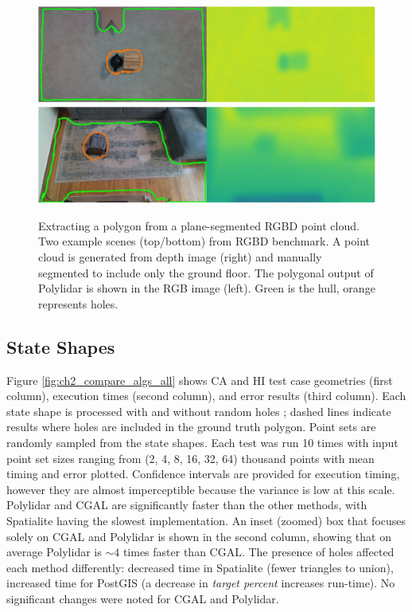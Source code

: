 \begin{figure}[ht] 
    \centering
      \includegraphics[width=0.80\linewidth]{chapter_2_polylidar/imgs/RealSensePictures-scene_08_stack.pdf}
      \includegraphics[width=0.80\linewidth]{chapter_2_polylidar/imgs/RealSensePictures-scene_11_stack.pdf}
  \caption[Extracting a polygon from a plane-segmented RGBD point cloud]{Extracting a polygon from a plane-segmented RGBD point cloud. Two example scenes (top/bottom) from RGBD benchmark. A point cloud is generated from depth image (right) and manually segmented to include only the ground floor. The polygonal output of Polylidar is shown in the RGB image (left). Green is the hull, orange represents holes. }
  \label{fig:ch2_realsense_benchmark} 
\end{figure}

\subsection{State Shapes}\label{sec:ch2_state_shapes}

Figure \ref{fig:ch2_compare_algs_all} shows CA and HI test case geometries (first column), execution times (second column), and error results (third column). Each state shape is processed with and without random holes
; dashed lines indicate results where holes are included in the ground truth polygon. Point sets are randomly sampled from the state shapes. Each test was run 10 times with input point set sizes ranging from (2, 4, 8, 16, 32, 64) thousand points with mean timing and error plotted. Confidence intervals are provided for execution timing, however they are almost imperceptible because the variance is low at this scale. Polylidar and CGAL are significantly faster than the other methods, with Spatialite having the slowest implementation. An inset (zoomed) box that focuses solely on CGAL and Polylidar is shown in the second column, showing that on average Polylidar is $\sim4$ times faster than CGAL. 
The presence of holes affected each method differently: decreased time in Spatialite (fewer triangles to union), increased time for PostGIS (a decrease in \emph{target percent} increases run-time). No significant changes were noted for CGAL and Polylidar.  

